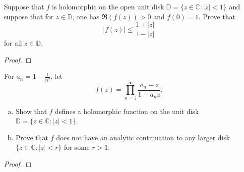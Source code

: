 \documentclass{article}
\newenvironment{problem}[2][Problem]{\begin{trivlist}
\item[\hskip \labelsep {\bfseries #1}\hskip \labelsep {\bfseries #2.}]}{\end{trivlist}}
\begin{document}
\begin{problem}{3}
  Suppose that $f$ is holomorphic on the open unit disk
  $\mathbb{D}=\{ z \in \mathbb{C} : |z| < 1 \}$
  and suppose that for $z \in \mathbb{D}$, one has $\mathfrak{R}(f(z)) > 0$ and
  $f(0) = 1$. Prove that \[
    |f(z)| \leq \frac{1 + |z|}{1 - |z|}
  \]  for all $z \in \mathbb{D}$.
\end{problem}

\begin{proof}
\end{proof}

\pagebreak

\begin{problem}{4}
  For $a_n = 1 - \frac{1}{n^2}$, let \[
    f(z) = \prod_{n=1}^\infty \frac{a_n - z}{1 - a_n z}.
  \]
  \begin{enumerate}[(a)]
    \item Show that $f$ defines a holomorphic function on the unit disk
      $\mathbb{D} = \{ z \in \mathbb{C} : |z| < 1 \}$.
    \item Prove that $f$ does not have an analytic continuation to any larger
      disk $\{ z \in \mathbb{C} : |z| < r \}$ for some $r > 1$.
  \end{enumerate}
\end{problem}

\begin{proof}
\end{proof}
\end{document}
